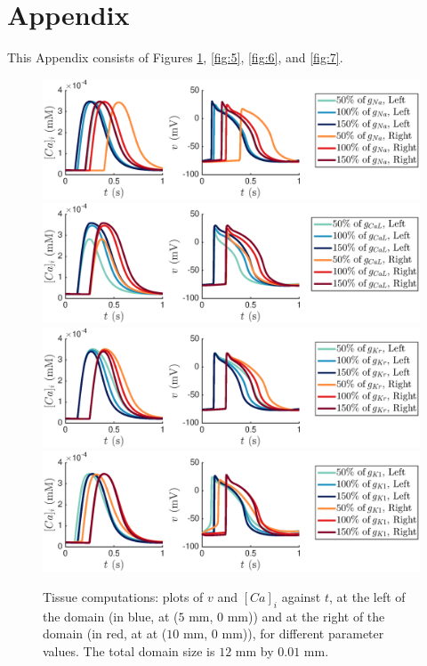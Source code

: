 \documentclass{article}
\begin{document}
\section*{Appendix} \label{Appendix}
%
This Appendix consists of Figures \ref{fig:4}, \ref{fig:5}, \ref{fig:6}, and \ref{fig:7}.
\begin{figure}
   \includegraphics[trim=3cm 0cm 4cm 0cm, clip=true, width=1\linewidth]{strip_gna} 
   \includegraphics[trim=3cm 0cm 4cm 0cm, clip=true, width=1\linewidth]{strip_gcal} 
      \includegraphics[trim=3cm 0cm 4cm 0cm, clip=true, width=1\linewidth]{strip_gkr} 
         \includegraphics[trim=3cm 0cm 4cm 0cm, clip=true, width=1\linewidth]{strip_gk1} 
    \caption{Tissue computations: plots of $v$ and $[Ca]_i$ against $t$, at the left of the domain (in blue, at ($5$ mm, $0$ mm)) and at the right of the domain (in red, at at ($10$ mm, $0$ mm)), for different parameter values. The total domain size is $12$ mm by $0.01$ mm.}
    \label{fig:4}
\end{figure}
\end{document}
